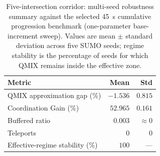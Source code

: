 \documentclass[12pt]{article}
\begin{document}
\begin{table}[H]
\centering
\caption{Five-intersection corridor: multi-seed robustness summary against the selected 45~s cumulative progression benchmark (one-parameter base-increment sweep). Values are mean $\pm$ standard deviation across five SUMO seeds; regime stability is the percentage of seeds for which QMIX remains inside the effective zone.}
\label{tab:n5_scalability_by_seed}
\begin{tabular}{lrr}
\toprule
\textbf{Metric} & \textbf{Mean} & \textbf{Std} \\
\midrule
QMIX approximation gap (\%)    & $-1.536$ & $0.815$     \\
Coordination Gain (\%)         & $52.965$ & $0.161$     \\
Buffered ratio                 & $0.003$  & $\approx 0$ \\
Teleports                      & $0$      & $0$         \\
Effective-regime stability (\%)& $100$    & ---         \\
\bottomrule
\end{tabular}
\end{table}
\end{document}
